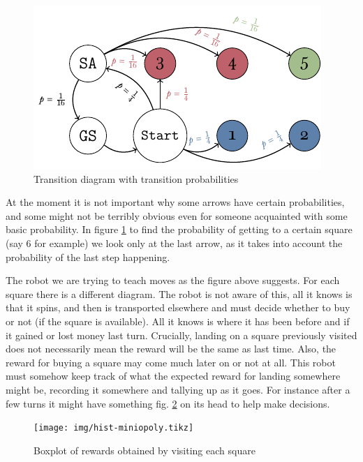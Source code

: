 \begin{figure}[h]
	\centering
	\includegraphics[width=\textwidth]{img/transicion-markov.pdf}
	\caption{Transition diagram with transition probabilities}
	\label{fig:miniopoly-transicion-markov}
\end{figure}

At the moment it is not important why some arrows have certain 
probabilities, and some might not be terribly obvious even for 
someone acquainted with some basic probability. In figure 
\ref{fig:miniopoly-transicion-markov} to find the probability 
of getting to a certain square (say 6 for example) we look only 
at the last arrow, as it takes into account the probability of 
the last step happening.

The robot we are trying to teach moves as the figure above 
suggests. For each square there is a different diagram. The 
robot is not aware of this, all it knows is that it spins, and 
then is transported elsewhere and must decide whether to buy or 
not (if the square is available). All it knows is where it has 
been before and if it gained or lost money last turn. 
Crucially, landing on a square previously visited does not 
necessarily mean the reward will be the same as last time. 
Also, the reward for buying a square may come much later on or 
not at all. This robot must somehow keep track of what the 
expected reward for landing somewhere might be, recording it 
somewhere and tallying up as it goes. For instance after a few 
turns it might have something fig. \ref{fig:hist-miniopoly} on 
its head to help make decisions.

\begin{figure}
\centering
\texttt{[image: img/hist-miniopoly.tikz]}
\label{fig:hist-miniopoly}
\caption{Boxplot of rewards obtained by visiting each square}
\end{figure}

